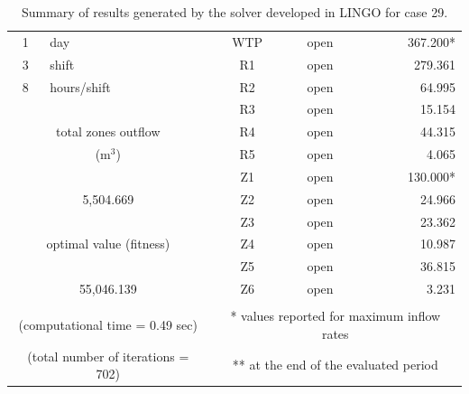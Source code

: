 \documentclass{singlecol}
\theoremstyle{TH}{
\newtheorem{lemma}{Lemma}
\newtheorem{theorem}[lemma]{Theorem}
\newtheorem{corrolary}[lemma]{Corrolary}
\newtheorem{conjecture}[lemma]{Conjecture}
\newtheorem{proposition}[lemma]{Proposition}
\newtheorem{claim}[lemma]{Claim}
\newtheorem{stheorem}[lemma]{Wrong Theorem}
\newtheorem{algorithm}{Algorithm}
}
\theoremstyle{THrm}{
\newtheorem{definition}{Definition}[section]
\newtheorem{question}{Question}[section]
\newtheorem{remark}{Remark}
\newtheorem{scheme}{Scheme}
}
\theoremstyle{THhit}{
\newtheorem{case}{Case}[section]
}
\begin{document}
\begin{table}[h!]
\begin{center}
\begin{small}
\begin{tabular}{ c r r r r r }
		   \\
		1   &  \multicolumn{1}{l}{day}   &              		& \multicolumn{1}{c}{WTP}    & \multicolumn{1}{c}{open} &  367.200* \\
		3   &  \multicolumn{1}{l}{shift}  &         			& \multicolumn{1}{c}{R1}     & \multicolumn{1}{c}{open} &  279.361  \\
		8   &  \multicolumn{1}{l}{hours/shift}        &         & \multicolumn{1}{c}{R2}     & \multicolumn{1}{c}{open} &   64.995  \\
	   &      &              									& \multicolumn{1}{c}{R3}     & \multicolumn{1}{c}{open} &   15.154  \\
	   \multicolumn{3}{c}{total zones outflow}                  & \multicolumn{1}{c}{R4}     & \multicolumn{1}{c}{open} &   44.315  \\
	   \multicolumn{3}{c}{($\mathrm{m^3}$)}              				& \multicolumn{1}{c}{R5}     & \multicolumn{1}{c}{open} &    4.065  \\
	   &      &              									& \multicolumn{1}{c}{Z1}     & \multicolumn{1}{c}{open} &  130.000* \\
	   \multicolumn{3}{c}{5,504.669}              			& \multicolumn{1}{c}{Z2}     & \multicolumn{1}{c}{open} &   24.966  \\
	      &              &              						& \multicolumn{1}{c}{Z3}     & \multicolumn{1}{c}{open} &   23.362  \\
	   \multicolumn{3}{c}{optimal value (fitness)}              & \multicolumn{1}{c}{Z4}     & \multicolumn{1}{c}{open} &   10.987  \\
	   &             &             						 		& \multicolumn{1}{c}{Z5}     & \multicolumn{1}{c}{open} &   36.815  \\
	   \multicolumn{3}{c}{55,046.139}              			& \multicolumn{1}{c}{Z6}     & \multicolumn{1}{c}{open} &    3.231 \\
	   \\
	   \multicolumn{3}{c}{(computational time = 0.49 sec)} & \multicolumn{3}{c}{* values reported for maximum inflow rates} \\
	   \multicolumn{3}{c}{(total number of iterations = 702)} & \multicolumn{3}{c}{** at the end of the evaluated period} 

	\end{tabular}
\caption{Summary of results generated by the solver developed in LINGO for case 29.}
\label{tab:lingoEvaluationsCase29}
\end{small}
\end{center}
\end{table}
\end{document}
